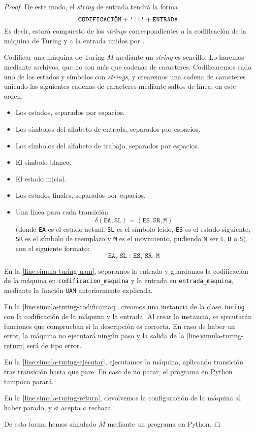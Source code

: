 \begin{proof}
De este modo, el \emph{string} de entrada tendrá la forma
$$
    \texttt{CODIFICACIÓN} + \texttt{\textquotesingle::\textquotesingle} + \texttt{ENTRADA}
$$
Es decir, estará compuesto de los \emph{strings} correspondientes a la codificación de la máquina de Turing y a la entrada unidos por \palabra{::}.

Codificar una máquina de Turing $M$ mediante un \emph{string} es sencillo. Lo haremos mediante archivos, que no son más que cadenas de caracteres. Codificaremos cada uno de los estados y símbolos con \emph{strings}, y crearemos una cadena de caracteres uniendo las siguientes cadenas de caracteres mediante saltos de línea, en este orden:
\begin{itemize}
    \item Los estados, separados por espacios.
    \item Los símbolos del alfabeto de entrada, separados por espacios.
    \item Los símbolos del alfabeto de trabajo, separados por espacios.
    \item El símbolo blanco.
    \item El estado inicial.
    \item Los estados finales, separados por espacios.
    \item Una línea para cada transición
        $$\delta(\texttt{EA}, \texttt{SL})=(\texttt{ES}, \texttt{SR}, \texttt{M})$$
    (donde \texttt{EA} es el estado actual, \texttt{SL} es el símbolo leído, \texttt{ES} es el estado siguiente, \texttt{SR} es el símbolo de reemplazo y \texttt{M} es el movimiento, pudiendo \texttt{M} ser \texttt{I}, \texttt{D} o \texttt{S}), con el siguiente formato:
    $$
        \texttt{EA, SL : ES, SR, M}
    $$
\end{itemize}

En la \cref{line:simula-turing-uam}, separamos la entrada y guardamos la codificación de la máquina en \linebreak\texttt{codificacion\_maquina} y la entrada en \texttt{entrada\_maquina}, mediante la función \texttt{UAM} anteriormente explicada.

En la \cref{line:simula-turing-codificamaq}, creamos una instancia de la clase \texttt{Turing} con la codificación de la máquina y la entrada. Al crear la instancia, se ejecutarán funciones que comprueban si la descripción es correcta. En caso de haber un error, la máquina no ejecutará ningún paso y la salida de la \cref{line:simula-turing-return} será de tipo error.

En la \cref{line:simula-turing-ejecutar}, ejecutamos la máquina, aplicando transición tras transición hasta que pare. En caso de no parar, el programa en Python tampoco parará.

En la \cref{line:simula-turing-return}, devolvemos la configuración de la máquina al haber parado, y si acepta o rechaza.

De esta forma hemos simulado $M$ mediante un programa en Python.
\end{proof}


